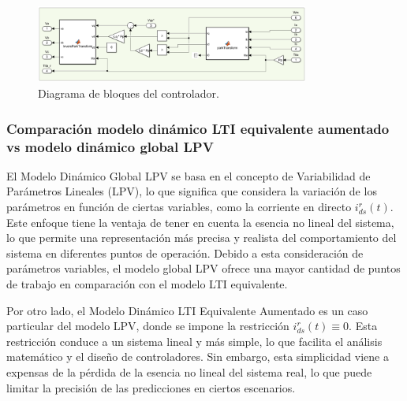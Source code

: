 \documentclass{article}
\begin{document}
\begin{enumerate}[label=\roman*.]
    \begin{figure}[H]
        \centering
        \includegraphics[width=0.8\textwidth]{LTI_AUMENTADO_Q_CONTROLADOR.png}
        \caption{Diagrama de bloques del controlador.}
    \end{figure}

\end{enumerate}


\subsubsection{Comparación modelo dinámico LTI equivalente aumentado vs modelo dinámico global LPV}

El Modelo Dinámico Global LPV se basa en el concepto de Variabilidad de Parámetros Lineales (LPV), 
lo que significa que considera la variación de los parámetros en función de ciertas variables, como 
la corriente en directo $i^r_{ds}(t)$. Este enfoque tiene la ventaja de tener en cuenta la esencia no 
lineal del sistema, lo que permite una representación más precisa y realista del comportamiento del 
sistema en diferentes puntos de operación. Debido a esta consideración de parámetros variables, el 
modelo global LPV ofrece una mayor cantidad de puntos de trabajo en comparación con el modelo LTI 
equivalente.

Por otro lado, el Modelo Dinámico LTI Equivalente Aumentado es un caso particular del modelo LPV, 
donde se impone la restricción $i^r_{ds}(t) \equiv 0$. Esta restricción conduce a un sistema lineal y más simple, lo que facilita el análisis 
matemático y el diseño de controladores. Sin embargo, esta simplicidad viene a expensas de la pérdida 
de la esencia no lineal del sistema real, lo que puede limitar la precisión de las predicciones en 
ciertos escenarios.
\end{document}
